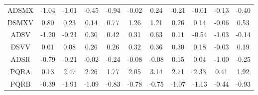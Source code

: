 \begin{longtable}{ | c || c | c | c | c | c | c | c | c | c || c |}
ADSMX &  \cellcolor[HTML]{FFE7E7} -1.04 &  \cellcolor[HTML]{FFE7E7} -1.01 &  \cellcolor[HTML]{FFF7F7} -0.45 &  \cellcolor[HTML]{FFE7E7} -0.94 &  \cellcolor[HTML]{FFFFFF} -0.02 &  \cellcolor[HTML]{F7F7FF} 0.24 &  \cellcolor[HTML]{FFF7F7} -0.21 &  \cellcolor[HTML]{FFFFFF} -0.01 &  \cellcolor[HTML]{FFFFFF} -0.13 &  \cellcolor[HTML]{FFF7F7} -0.40 \\
DSMXV &  \cellcolor[HTML]{E7E7FF} 0.80 &  \cellcolor[HTML]{F7F7FF} 0.23 &  \cellcolor[HTML]{FFFFFF} 0.14 &  \cellcolor[HTML]{EFEFFF} 0.77 &  \cellcolor[HTML]{DFDFFF} 1.26 &  \cellcolor[HTML]{DFDFFF} 1.21 &  \cellcolor[HTML]{F7F7FF} 0.26 &  \cellcolor[HTML]{FFFFFF} 0.14 &  \cellcolor[HTML]{FFFFFF} -0.06 &  \cellcolor[HTML]{EFEFFF} 0.53 \\
ADSV &  \cellcolor[HTML]{FFDFDF} -1.20 &  \cellcolor[HTML]{FFF7F7} -0.21 &  \cellcolor[HTML]{F7F7FF} 0.30 &  \cellcolor[HTML]{F7F7FF} 0.42 &  \cellcolor[HTML]{F7F7FF} 0.31 &  \cellcolor[HTML]{EFEFFF} 0.63 &  \cellcolor[HTML]{FFFFFF} 0.11 &  \cellcolor[HTML]{FFEFEF} -0.54 &  \cellcolor[HTML]{FFE7E7} -1.03 &  \cellcolor[HTML]{FFFFFF} -0.14 \\
DSVV &  \cellcolor[HTML]{FFFFFF} 0.01 &  \cellcolor[HTML]{FFFFFF} 0.08 &  \cellcolor[HTML]{F7F7FF} 0.26 &  \cellcolor[HTML]{F7F7FF} 0.26 &  \cellcolor[HTML]{F7F7FF} 0.32 &  \cellcolor[HTML]{F7F7FF} 0.36 &  \cellcolor[HTML]{F7F7FF} 0.30 &  \cellcolor[HTML]{F7F7FF} 0.18 &  \cellcolor[HTML]{FFFFFF} -0.03 &  \cellcolor[HTML]{F7F7FF} 0.19 \\
ADSR &  \cellcolor[HTML]{FFEFEF} -0.79 &  \cellcolor[HTML]{FFF7F7} -0.21 &  \cellcolor[HTML]{FFFFFF} -0.02 &  \cellcolor[HTML]{FFF7F7} -0.24 &  \cellcolor[HTML]{FFFFFF} -0.08 &  \cellcolor[HTML]{FFFFFF} -0.08 &  \cellcolor[HTML]{FFFFFF} 0.15 &  \cellcolor[HTML]{FFFFFF} 0.04 &  \cellcolor[HTML]{FFE7E7} -1.00 &  \cellcolor[HTML]{FFF7F7} -0.25 \\
PQRA &  \cellcolor[HTML]{FFFFFF} 0.13 &  \cellcolor[HTML]{BFBFFF} 2.47 &  \cellcolor[HTML]{C7C7FF} 2.26 &  \cellcolor[HTML]{CFCFFF} 1.77 &  \cellcolor[HTML]{CFCFFF} 2.05 &  \cellcolor[HTML]{AFAFFF} 3.14 &  \cellcolor[HTML]{B7B7FF} 2.71 &  \cellcolor[HTML]{C7C7FF} 2.33 &  \cellcolor[HTML]{F7F7FF} 0.41 &  \cellcolor[HTML]{CFCFFF} 1.92 \\
PQRB &  \cellcolor[HTML]{FFF7F7} -0.39 &  \cellcolor[HTML]{FFCFCF} -1.91 &  \cellcolor[HTML]{FFE7E7} -1.09 &  \cellcolor[HTML]{FFE7E7} -0.83 &  \cellcolor[HTML]{FFEFEF} -0.78 &  \cellcolor[HTML]{FFEFEF} -0.75 &  \cellcolor[HTML]{FFE7E7} -1.07 &  \cellcolor[HTML]{FFDFDF} -1.13 &  \cellcolor[HTML]{FFF7F7} -0.44 &  \cellcolor[HTML]{FFE7E7} -0.93 \\

\end{longtable}
